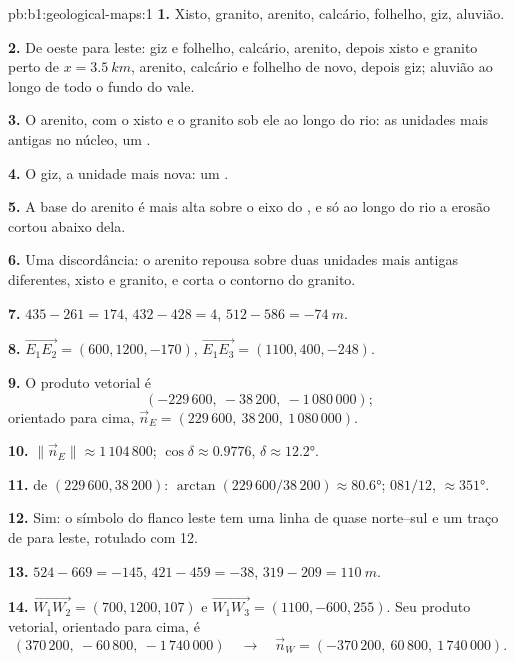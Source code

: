 \begin{solution}{pb:b1:geological-maps:1}
\textbf{1.} Xisto, granito, arenito, calcário, folhelho, giz, aluvião.

\textbf{2.} De oeste para leste: giz e folhelho, calcário, arenito, depois xisto e granito perto de $x = \qty{3.5}{km}$, arenito, calcário e folhelho de novo, depois giz; aluvião ao longo de todo o fundo do vale.

\textbf{3.} O arenito, com o xisto e o granito sob ele ao longo do rio: as unidades mais antigas no núcleo, um .

\textbf{4.} O giz, a unidade mais nova: um .

\textbf{5.} A base do arenito é mais alta sobre o eixo do , e só ao longo do rio a erosão cortou abaixo dela.

\textbf{6.} Uma discordância: o arenito repousa sobre duas unidades mais antigas diferentes, xisto e granito, e corta o contorno do granito.

\textbf{7.} $435 - 261 = 174$, $432 - 428 = 4$, $512 - 586 = \qty{-74}{m}$.

\textbf{8.} $\overrightarrow{E_1E_2} = (600, 1200, -170)$,
$\overrightarrow{E_1E_3} = (1100, 400, -248)$.

\textbf{9.} O produto vetorial é
\[
  (-229\,600,\ -38\,200,\ -1\,080\,000);
\]
orientado para cima, $\vec n_E = (229\,600,\ 38\,200,\ 1\,080\,000)$.

\textbf{10.} $\|\vec n_E\| \approx 1\,104\,800$; $\cos\delta \approx 0.9776$,
$\delta \approx \ang{12.2}$.

\textbf{11.}  de $(229\,600, 38\,200)$: $\arctan(229\,600/38\,200)
\approx \ang{80.6}$;  $081/12$,  $\approx \ang{351}$.

\textbf{12.} Sim: o símbolo do flanco leste tem uma linha de  quase norte--sul e um traço de  para leste, rotulado com 12.

\textbf{13.} $524 - 669 = -145$, $421 - 459 = -38$, $319 - 209 =
\qty{110}{m}$.

\textbf{14.} $\overrightarrow{W_1W_2} = (700, 1200, 107)$ e
$\overrightarrow{W_1W_3} = (1100, -600, 255)$. Seu produto vetorial, orientado para cima, é
\[
  (370\,200,\ -60\,800,\ -1\,740\,000) \quad\longrightarrow\quad
  \vec n_W = (-370\,200,\ 60\,800,\ 1\,740\,000).
\]


\end{solution}
